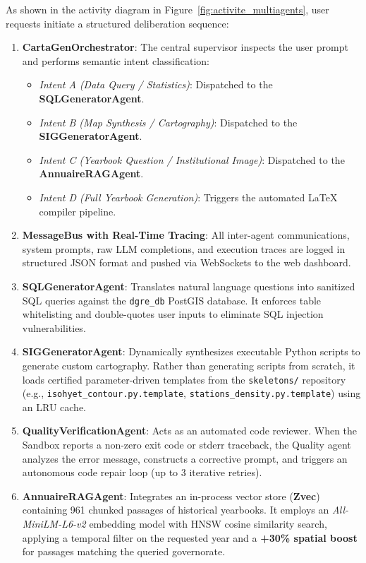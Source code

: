 \documentclass[12pt,a4paper]{report}
\begin{document}
As shown in the activity diagram in Figure~\ref{fig:activite_multiagents}, user requests initiate a structured deliberation sequence:
\begin{enumerate}
  \item \textbf{CartaGenOrchestrator}: The central supervisor inspects the user prompt and performs semantic intent classification:
  \begin{itemize}
    \item \textit{Intent A (Data Query / Statistics)}: Dispatched to the \textbf{SQLGeneratorAgent}.
    \item \textit{Intent B (Map Synthesis / Cartography)}: Dispatched to the \textbf{SIGGeneratorAgent}.
    \item \textit{Intent C (Yearbook Question / Institutional Image)}: Dispatched to the \textbf{AnnuaireRAGAgent}.
    \item \textit{Intent D (Full Yearbook Generation)}: Triggers the automated LaTeX compiler pipeline.
  \end{itemize}
  \item \textbf{MessageBus with Real-Time Tracing}: All inter-agent communications, system prompts, raw LLM completions, and execution traces are logged in structured JSON format and pushed via WebSockets to the web dashboard.
  \item \textbf{SQLGeneratorAgent}: Translates natural language questions into sanitized SQL queries against the \texttt{dgre\_db} PostGIS database. It enforces table whitelisting and double-quotes user inputs to eliminate SQL injection vulnerabilities.
  \item \textbf{SIGGeneratorAgent}: Dynamically synthesizes executable Python scripts to generate custom cartography. Rather than generating scripts from scratch, it loads certified parameter-driven templates from the \texttt{skeletons/} repository (e.g., \texttt{isohyet\_contour.py.template}, \texttt{stations\_density.py.template}) using an LRU cache.
  \item \textbf{QualityVerificationAgent}: Acts as an automated code reviewer. When the Sandbox reports a non-zero exit code or stderr traceback, the Quality agent analyzes the error message, constructs a corrective prompt, and triggers an autonomous code repair loop (up to 3 iterative retries).
  \item \textbf{AnnuaireRAGAgent}: Integrates an in-process vector store (\textbf{Zvec}) containing 961 chunked passages of historical yearbooks. It employs an \textit{All-MiniLM-L6-v2} embedding model with HNSW cosine similarity search, applying a temporal filter on the requested year and a \textbf{+30\% spatial boost} for passages matching the queried governorate.
\end{enumerate}
\end{document}
